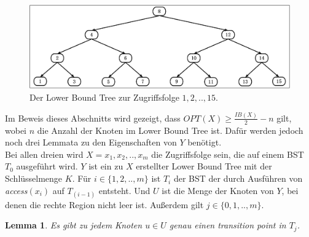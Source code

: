 \documentclass[a4paper,12pt]{article}
\newtheorem{Lemma}{Lemma}[section]
\begin{document}
\begin{figure}[H]
	\centering
	\includegraphics[width=1\textwidth]{Medien/Tango/lowerBoundTree}
	\caption{Der Lower Bound Tree zur Zugriffsfolge $1 ,2, .., 15$.  }
	\label{fig:demlowerBoundTree}
\end{figure}

\noindent Im Beweis dieses Abschnitts wird gezeigt, dass $\mathit{OPT}\left(X\right) \geq \frac{\mathit{IB}\left(X\right)}{2} - n$ gilt, wobei $n$ die Anzahl der Knoten im Lower Bound Tree ist. Dafür werden jedoch noch drei Lemmata zu den Eigenschaften von $Y$ benötigt.\\
 Bei allen dreien wird $X = x_1, x_2,.., x_m$ die Zugriffsfolge sein, die auf einem BST $T_0$ ausgeführt wird. $Y$ ist ein zu $X$ erstellter Lower Bound Tree mit der Schlüsselmenge $K$.
Für $i \in \{1,2,..,m\}$ ist $T_i$ der BST der durch Ausführen von \textit{access}$\left(x_i\right)$ auf $T_{\left(i-1\right)}$ entsteht. Und $U$ ist die Menge der Knoten von $Y$, bei denen die rechte Region nicht leer ist. Außerdem gilt   $j \in \{0,1,..,m\}$.
\begin{Lemma} \label{demaineLemma1}
Es gibt zu jedem Knoten $u \in U$ genau einen transition point in $T_j$. 	
\end{Lemma}
\end{document}
